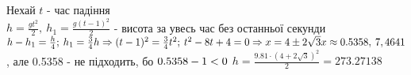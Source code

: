 \documentclass[a4paper,12pt]{article}
\begin{document}
	 Нехай $t$ - час падіння\\
	 $h=\frac{gt^2}{2},\>h_1=\frac{g(t-1)^2}{2}$ - висота за увесь час без останньої секунди\\
	 $h-h_1=\frac h4;\>h_1=\frac34h\Rightarrow(t-1)^2=\frac34t^2;\>t^2-8t+4=0\Rightarrow x= 4\pm 2\sqrt3\\x\approx 0.5358,\>7,4641$, але 0.5358 - не підходить, бо $0.5358-1<0\\$
	 $h=\frac{9.81\cdot (4+2\sqrt3)^2}{2}=273.27138$
\end{document}
